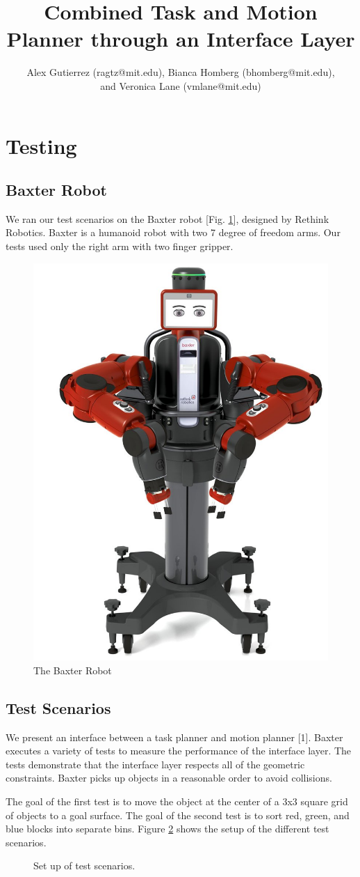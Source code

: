 \documentclass[12pt]{article}
\title{Combined Task and Motion Planner through an Interface Layer}
\author{Alex Gutierrez (ragtz@mit.edu), Bianca Homberg (bhomberg@mit.edu), \\and Veronica Lane (vmlane@mit.edu)}
\begin{document}
\maketitle 


\section{Testing}

\subsection{Baxter Robot}

We ran our test scenarios on the Baxter robot [Fig. \ref{fig:baxter}], designed by Rethink Robotics. 
Baxter is a humanoid robot with two 7 degree of freedom arms. 
Our tests used only the right arm with two finger gripper.

\begin{figure}[h]
\centering
\includegraphics[width=.2\textwidth]{baxter}
\caption{The Baxter Robot \label{fig:baxter}}
\end{figure}

\subsection{Test Scenarios}

We present an interface between a task planner and motion planner [1]. 
Baxter executes a variety of tests to measure the performance of the interface layer. 
The tests demonstrate that the interface layer respects all of the geometric constraints. 
Baxter picks up objects in a reasonable order to avoid collisions.

The goal of the first test is to move the object at the center of a 3x3 square grid of objects to a goal surface. 
The goal of the second test is to sort red, green, and blue blocks into separate bins.
Figure \ref{fig:scenarios} shows the setup of the different test scenarios. 

\begin{figure}[h]
\centering
\def\svgwidth{.4\textwidth}

\caption{Set up of test scenarios.\label{fig:scenarios}}
\end{figure}
\end{document}
